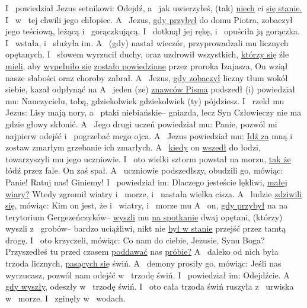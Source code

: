  I~ powiedział Jezus setnikowi: Odejdź, a~ jak uwierzyłeś, (tak) \underline{niech} ci \underline{się stanie.} I~ w~ tej chwili  jego chłopiec.
 A~ Jezus, \underline{gdy przybył} do domu Piotra, zobaczył jego teściową, leżącą i~ gorączkującą.
 I~ dotknął jej rękę, i~ opuściła ją gorączka. I~ wstała, i~ służyła im.
 A~ (gdy) nastał wieczór, przyprowadzali mu licznych opętanych. I~ słowem wyrzucił duchy, oraz uzdrowił wszystkich, \underline{którzy się} źle \underline{mieli,}
 aby \underline{wypełniło się}  \underline{zostało powiedziane} przez proroka Izajasza,  On wziął nasze słabości oraz choroby zabrał.
 A~ Jezus, \underline{gdy zobaczył} liczny tłum wokół siebie, kazał odpłynąć na 
 A~ jeden (ze) \underline{znawców Pisma} podszedł (i) powiedział mu: Nauczycielu,  tobą, gdziekolwiek gdziekolwiek (ty) pójdziesz.
 I~ rzekł mu Jezus: Lisy mają nory, a~ ptaki niebiańskie– gniazda, lecz Syn Człowieczy nie ma gdzie głowy skłonić.
 A~ Jego drugi uczeń powiedział mu: Panie, pozwól mi najpierw odejść i~ pogrzebać mego ojca.
 A~ Jezus powiedział mu: \underline{Idź za} mną i~ zostaw zmarłym grzebanie ich zmarłych.
 A~ \underline{kiedy} on \underline{wszedł} do łodzi, towarzyszyli mu jego uczniowie.
 I~ oto wielki sztorm powstał na morzu, \underline{tak że} łódź  przez fale. On zaś spał.
 A~ uczniowie podszedłszy, obudzili go, mówiąc: Panie! Ratuj nas! Giniemy!
 I~ powiedział im: Dlaczego jesteście lękliwi, \underline{małej wiary?} Wtedy  zgromił wiatry i~ morze, i~ nastała wielka cisza.
 A~ ludzie \underline{zdziwili się,} mówiąc: Kim on jest, że i~ wiatry, i~ morze  mu 
 A~ on, \underline{gdy przybył} na  na terytorium Gergezeńczyków– \underline{wyszli} mu \underline{na spotkanie} dwaj opętani, (którzy) wyszli z~ grobów– bardzo uciążliwi,  nikt nie \underline{był w stanie} przejść przez tamtą drogę.
 I~ oto krzyczeli, mówiąc: Co nam do ciebie, Jezusie, Synu Boga? Przyszedłeś tu przed czasem \underline{poddawać} nas \underline{próbie?}
 A~ daleko od nich była trzoda licznych, \underline{pasących się} świń.
 A~ demony prosiły go, mówiąc: Jeśli nas wyrzucasz, pozwól nam odejść w~ trzodę świń.
 I~ powiedział im: Odejdźcie. A~ \underline{gdy wyszły,} odeszły w~ trzodę świń. I~ oto cała trzoda świń ruszyła z~ urwiska w~ morze. I~ zginęły w~ wodach.
